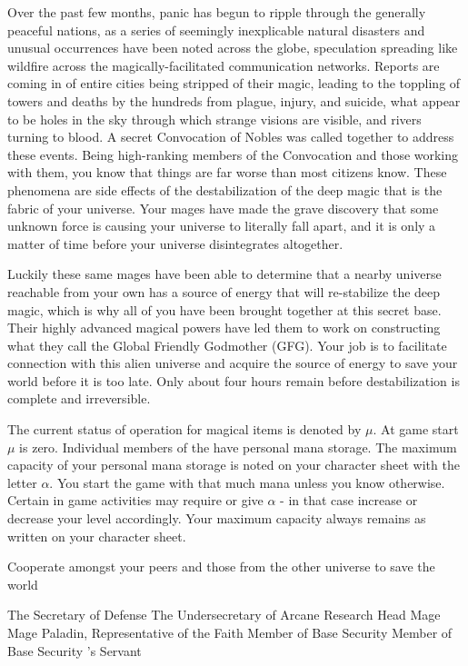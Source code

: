\documentclass[blue]{guildcamp3}
\begin{document}
Over the past few months, panic has begun to ripple through the generally peaceful nations, as a series of seemingly inexplicable natural disasters and unusual occurrences have been noted across the globe, speculation spreading like wildfire across the magically-facilitated communication networks. Reports are coming in of entire cities being stripped of their magic, leading to the toppling of towers and deaths by the hundreds from plague, injury, and suicide, what appear to be holes in the sky through which strange visions are visible, and rivers turning to blood. A secret Convocation of Nobles was called together to address these events. Being high-ranking members of the Convocation and those working with them, you know that things are far worse than most citizens know. These phenomena are side effects of the destabilization of the deep magic that is the fabric of your universe. Your mages have made the grave discovery that some unknown force is causing your universe to literally fall apart, and it is only a matter of time before your universe disintegrates altogether.

Luckily these same mages have been able to determine that a nearby universe reachable from your own has a source of energy that will re-stabilize the deep magic, which is why all of you have been brought together at this secret base. Their highly advanced magical powers have led them to work on constructing what they call the Global Friendly Godmother (GFG). Your job is to facilitate connection with this alien universe and acquire the source of energy to save your world before it is too late. Only about four hours remain before destabilization is complete and irreversible.

The current status of operation for magical items is denoted by $\mu$. At game start $\mu$ is zero. Individual members of the \bMagicWorld{} have personal mana storage. The maximum capacity of your personal mana storage is noted on your character sheet with the letter $\alpha$. You start the game with that much mana unless you know otherwise. Certain in game activities may require or give $\alpha$ - in that case increase or decrease your level accordingly. Your maximum capacity always remains as written on your character sheet. 

\begin{itemz}[Goals]
	\item Cooperate amongst your peers and those from the other universe to save the world
\end{itemz}


\begin{members}
	\member{\cNobleOne{}} The Secretary of Defense
	\member{\cNobleTwo{}} The Undersecretary of Arcane Research
	\member{\cMageOne{}} Head Mage
	\member{\cMageTwo{}} Mage
	\member{\cPaladin{}} Paladin, Representative of the Faith
	\member{\cRogueOne{}} Member of Base Security
	\member{\cRogueTwo{}} Member of Base Security
	\member{\cServant{}} \cNobleOne{}'s Servant
\end{members}
\end{document}
